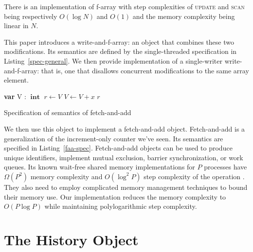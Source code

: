 \documentclass[a4paper,11pt]{article}
\def\int{\ensuremath{\operatorname{\textbf{int}}}}
\newcommand{\fn}[1]{\textsc{#1}}
\newcommand{\var}[2]{\textbf{var }#1 : #2}
\begin{document}
There is an implementation of f-array with step complexities of \fn{update} and \fn{scan} being respectively $O(\log N)$ and $O(1)$ and the memory complexity
being linear in $N$.

This paper introduces a write-and-f-array: an object that combines these two modifications. Its semantics are defined by the single-threaded specification in Listing~\ref{spec-general}. We then provide implementation of a single-writer
write-and-f-array: that is, one that disallows concurrent modifications to the same array element.

\begin{Listing}
\begin{algorithmic}[1]
\State\var{V}{\int}
	\State $r \gets V$
	\State $V \gets V + x$
	\State\Return $r$
\EndFunction
\end{algorithmic}
\caption{Specification of semantics of fetch-and-add}
\label{faa-spec}
\end{Listing}

We then use this object to implement a fetch-and-add object. Fetch-and-add is a generalization of the increment-only counter we've seen. Its semantics are specified in Listing~\ref{faa-spec}.
Fetch-and-add objects can be used to produce unique identifiers, implement
mutual exclusion, barrier synchronization\cite{faa-sync}, or work queues\cite{faa-queue}. Its known wait-free shared memory implementations for $P$ processes have $\Omega(P^2)$ memory complexity and $O(\log^2 P)$ step complexity
of the operation \cite{ellen-fai}\cite{closed-object}. They also need to employ complicated memory management techniques to bound their memory use. Our implementation reduces the memory complexity to $O(P\log P)$ while maintaining polylogarithmic step complexity.




\section{The History Object}
\end{document}
